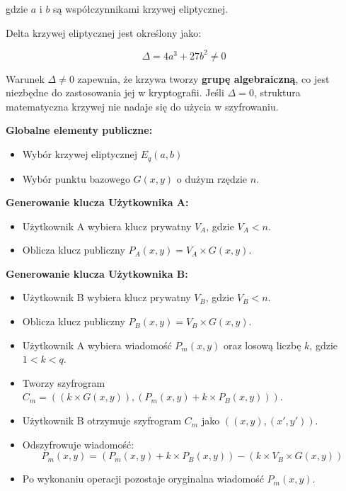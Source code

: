 \documentclass[conference]{IEEEtran}
\begin{document}
gdzie $a$ i $b$ są współczynnikami krzywej eliptycznej.

Delta krzywej eliptycznej jest określony jako:

\[
    \Delta = 4a^3 + 27b^2 \neq 0
\]

Warunek $\Delta \neq 0$ zapewnia, że krzywa tworzy \textbf{grupę algebraiczną}, co jest niezbędne do zastosowania jej w kryptografii. Jeśli $\Delta = 0$, struktura matematyczna krzywej nie nadaje się do użycia w szyfrowaniu.

 \textbf{Globalne elementy publiczne:}
    \begin{itemize}
        \item Wybór krzywej eliptycznej $E_q(a, b)$
        \item Wybór punktu bazowego $G(x, y)$ o dużym rzędzie $n$.
    \end{itemize}

    \textbf{Generowanie klucza Użytkownika A:}
    \begin{itemize}
        \item Użytkownik A wybiera klucz prywatny $V_A$, gdzie $V_A < n$.
        \item Oblicza klucz publiczny $P_A(x, y) = V_A \times G(x, y)$.
    \end{itemize}

    \textbf{Generowanie klucza Użytkownika B:}
    \begin{itemize}
        \item Użytkownik B wybiera klucz prywatny $V_B$, gdzie $V_B < n$.
        \item Oblicza klucz publiczny $P_B(x, y) = V_B \times G(x, y)$.
    \end{itemize}



    \begin{itemize}
        \item Użytkownik A wybiera wiadomość $P_m(x, y)$ oraz losową liczbę $k$, gdzie $1 < k < q$.
        \item Tworzy szyfrogram $C_m = ((k \times G(x, y)), (P_m(x, y) + k \times P_B(x, y)))$.
    \end{itemize}
    \begin{itemize}
        \item Użytkownik B otrzymuje szyfrogram $C_m$ jako $((x, y), (x', y'))$.
        \item Odszyfrowuje wiadomość:
        \[
            P_m(x, y) = (P_m(x, y) + k \times P_B(x, y)) - (k \times V_B \times G(x, y))
        \]
        \item Po wykonaniu operacji pozostaje oryginalna wiadomość $P_m(x, y)$.
    \end{itemize}
\end{document}
